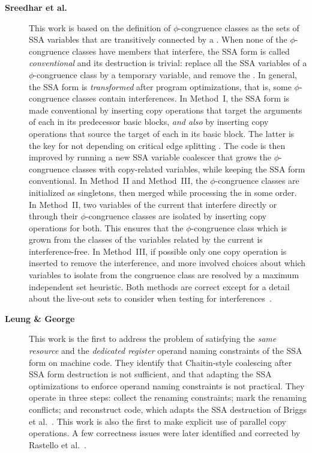 \begin{description}
\item[\textbf{Sreedhar et al.~\cite{Sreedhar:1999:SAS}}] This work is based
on the definition of $\phi$-congruence classes as the sets of SSA variables that are transitively
connected by a \phifun. When none of the $\phi$-congruence classes have
members that interfere, the SSA form is called \emph{conventional} and its
destruction is trivial: replace all the SSA variables of a $\phi$-congruence
class by a temporary variable, and remove the \phifuns. In general, the
SSA form is \emph{transformed} after program optimizations, that is, some
$\phi$-congruence classes contain interferences.  In Method~I, the SSA form is
made conventional by inserting copy operations that target the arguments of each
\phifun in its predecessor basic blocks, \emph{and also} by inserting
copy operations that source the target of each \phifun in its basic
block. The latter is the key for not depending on critical edge splitting
\cite{Boissinot:2009:CGO}. The code is then improved by running a new SSA
variable coalescer that grows the $\phi$-congruence classes with copy-related
variables, while keeping the SSA form conventional. In Method~II and Method~III, the
$\phi$-congruence classes are initialized as singletons, then merged while
processing the \phifuns in some order. In Method~II, two variables of
the current \phifun that interfere directly or through their
$\phi$-congruence classes are isolated by inserting copy operations for both.
This ensures that the $\phi$-congruence class which is grown from the classes of
the variables related by the current \phifun is interference-free. In
Method~III, if possible only one copy operation is inserted to remove the
interference, and more involved choices about which variables to isolate from
the \phifun congruence class are resolved by a maximum independent set
heuristic.  Both methods are correct except for a detail about the live-out sets
to consider when testing for interferences~\cite{Boissinot:2009:CGO}.

\item[\textbf{Leung \& George~\cite{Leung:1999:PLDI}}] This work is the first to address the
problem of satisfying the \emph{same resource} and the \emph{dedicated register} operand
naming constraints of the SSA form on machine code. They identify that
Chaitin-style coalescing after SSA form destruction is not sufficient, and that
adapting the SSA optimizations to enforce operand naming constraints is not
practical.  They operate in three steps: collect the renaming constraints; mark
the renaming conflicts; and reconstruct code, which adapts the SSA destruction
of Briggs et al.~\cite{Briggs:1998:SPE}. This work is also the first to make
explicit use of parallel copy operations. A few correctness issues were later
identified and corrected by Rastello et al.~\cite{Rastello:2004:CGO}.


\end{description}
